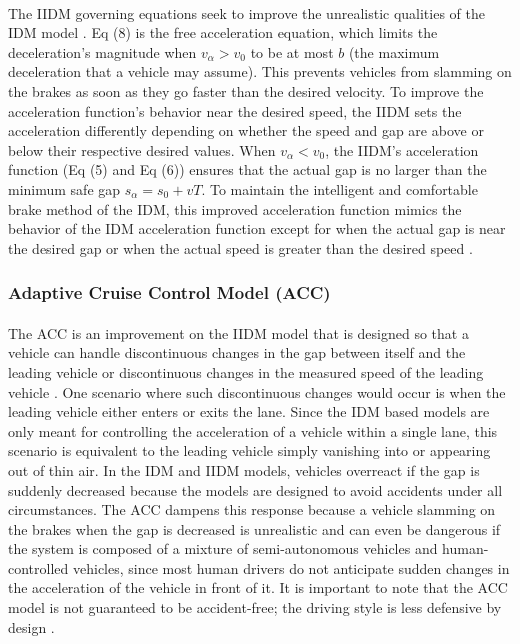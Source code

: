 \documentclass[12pt]{article}
\begin{document}
\paragraph{}
The IIDM governing equations seek to improve the unrealistic qualities of the IDM model \cite{intelligent_driver_model}. Eq (8) is the free acceleration equation, which limits the deceleration's magnitude when $v_\alpha>v_0$ to be at most $b$ (the maximum deceleration that a vehicle may assume). This prevents vehicles from slamming on the brakes as soon as they go faster than the desired velocity.  To improve the acceleration function's behavior near the desired speed, the IIDM sets the acceleration differently depending on whether the speed and gap are above or below their respective desired values.  When $v_\alpha < v_0$, the IIDM's acceleration function (Eq (5) and Eq (6)) ensures that the actual gap is no larger than the minimum safe gap $s_\alpha = s_0+vT$.  To maintain the intelligent and comfortable brake method of the IDM, this improved acceleration function mimics the behavior of the IDM acceleration function except for when the actual gap is near the desired gap or when the actual speed is greater than the desired speed \cite[Chapter~11]{treiber_kesting_2013}.
\subsubsection{Adaptive Cruise Control Model (ACC)}
\paragraph{}
The ACC is an improvement on the IIDM model that is designed so that a vehicle can handle discontinuous changes in the gap between itself and the leading vehicle or discontinuous changes in the measured speed of the leading vehicle \cite[Chapter~11]{treiber_kesting_2013}.  One scenario where such discontinuous changes would occur is when the leading vehicle either enters or exits the lane.  Since the IDM based models are only meant for controlling the acceleration of a vehicle within a single lane, this scenario is equivalent to the leading vehicle simply vanishing into or appearing out of thin air.  In the IDM and IIDM models, vehicles overreact if the gap is suddenly decreased because the models are designed to avoid accidents under all circumstances.  The ACC dampens this response because a vehicle slamming on the brakes when the gap is decreased is unrealistic and can even be dangerous if the system is composed of a mixture of semi-autonomous vehicles and human-controlled vehicles, since most human drivers do not anticipate sudden changes in the acceleration of the vehicle in front of it.  It is important to note that the ACC model is not guaranteed to be accident-free; the driving style is less defensive by design  \cite[Chapter~11]{treiber_kesting_2013}\cite{loos_platzer_nistor_2011}.
\end{document}
